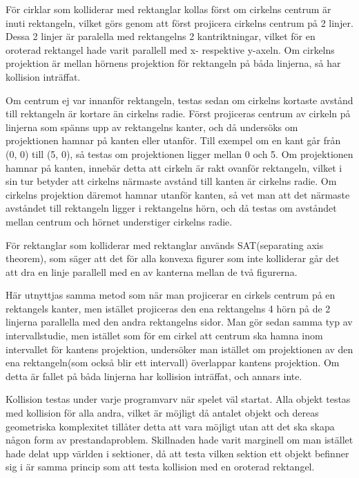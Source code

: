 \documentclass[12pt,a4paper]{article}
\newcounter{subsubsubsection}[subsubsection]
\begin{document}
\vspace{0.2cm}

För cirklar som kolliderar med rektanglar kollas först om cirkelns centrum är inuti rektangeln, vilket görs genom att först projicera cirkelns centrum på 2 linjer. Dessa 2 linjer är paralella med rektangelns 2 kantriktningar, vilket för en oroterad rektangel hade varit parallell med x- respektive y-axeln. Om cirkelns projektion är mellan hörnens projektion för rektangeln på båda linjerna, så har kollision inträffat.

\vspace{0.2cm}

Om centrum ej var innanför rektangeln, testas sedan om cirkelns kortaste avstånd till rektangeln är kortare än cirkelns radie. Först projiceras centrum av cirkeln på linjerna som spänns upp av rektangelns kanter, och då undersöks om projektionen hamnar på kanten eller utanför. Till exempel om en kant går från (0, 0) till (5, 0), så testas om projektionen ligger mellan 0 och 5. Om projektionen hamnar på kanten, innebär detta att cirkeln är rakt ovanför rektangeln, vilket i sin tur betyder att cirkelns närmaste avstånd till kanten är cirkelns radie. Om cirkelns projektion däremot hamnar utanför kanten, så vet man att det närmaste avståndet till rektangeln ligger i rektangelns hörn, och då testas om avståndet mellan centrum och hörnet understiger cirkelns radie.

\vspace{0.2cm}

För rektanglar som kolliderar med rektanglar används SAT(separating axis theorem), som säger att det för alla konvexa figurer som inte kolliderar går det att dra en linje parallell med en av kanterna mellan de två figurerna.

Här utnyttjas samma metod som när man projicerar en cirkels centrum på en rektangels kanter, men istället projiceras den ena rektangelns 4 hörn på de 2 linjerna parallella med den andra rektangelns sidor. Man gör sedan samma typ av intervallstudie, men istället som för em cirkel att centrum ska hamna inom intervallet för kantens projektion, undersöker man istället om projektionen av den ena rektangeln(som också blir ett intervall) överlappar kantens projektion. Om detta är fallet på båda linjerna har kollision inträffat, och annars inte.

Kollision testas under varje programvarv när spelet väl startat. Alla objekt testas med kollision för alla andra, vilket är möjligt då antalet objekt och dereas geometriska komplexitet tillåter detta att vara möjligt utan att det ska skapa någon form av prestandaproblem. Skillnaden hade varit marginell om man istället hade delat upp världen i sektioner, då att testa vilken sektion ett objekt befinner sig i är samma princip som att testa kollision med en oroterad rektangel. 
\end{document}
